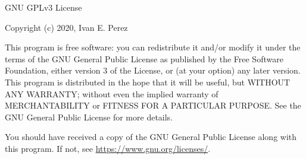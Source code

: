 \noindent GNU GPLv3 License

\medskip
\noindent Copyright (c) 2020, Ivan E. Perez

\medskip
\noindent This program is free software: you can redistribute it and/or modify
it under the terms of the GNU General Public License as published by
the Free Software Foundation, either version 3 of the License, or
(at your option) any later version.
\smallskip
\noindent This program is distributed in the hope that it will be useful,
but WITHOUT ANY WARRANTY; without even the implied warranty of
MERCHANTABILITY or FITNESS FOR A PARTICULAR PURPOSE.  See the
GNU General Public License for more details.
\smallskip

\noindent You should have received a copy of the GNU General Public License
along with this program.  If not, see \href{https://www.gnu.org/licenses/}{https://www.gnu.org/licenses/}.